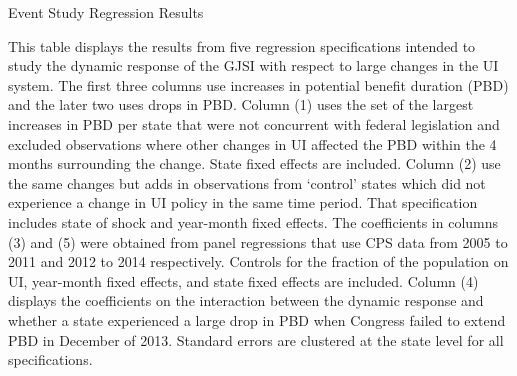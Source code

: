 \documentclass[12pt]{article}
\begin{document}
\begin{spacing}{2}
\begin{sidewaystable}
\caption{Event Study Regression Results \label{tab:eventstudy}}
\centering
\begin{threeparttable}

\begin{tablenotes}
\item This table displays the results from five regression specifications intended to study the dynamic response of the GJSI with respect to large changes in the UI system. The first three columns use increases in potential benefit duration (PBD) and the later two uses drops in PBD. Column (1) uses the set of the largest increases in PBD per state that were not concurrent with federal legislation and excluded observations where other changes in UI affected the PBD within the 4 months surrounding the change. State fixed effects are included. Column (2) use the same changes but adds in observations from `control' states which did not experience a change in UI policy in the same time period. That specification includes state of shock and year-month fixed effects. The coefficients in columns (3) and (5) were obtained from panel regressions that use CPS data from 2005 to 2011 and 2012 to 2014 respectively. Controls for the fraction of the population on UI, year-month fixed effects, and state fixed effects are included. Column (4) displays the coefficients on the interaction between the dynamic response and whether a state experienced a large drop in PBD when Congress failed to extend PBD in December of 2013. Standard errors are clustered at the state level for all specifications.
\end{tablenotes}
\end{threeparttable}
\end{sidewaystable}


\end{spacing}
\end{document}
